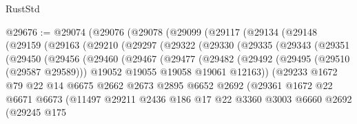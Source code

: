\begin{lexlean}{RustStd}
\begin{coremodule}
@29676 := @29074
    (@29076
      (@29078
        (@29099
          (@29117
            (@29134
              (@29148
                (@29159
                  (@29163
                    (@29210
                      (@29297
                        (@29322
                          (@29330
                            (@29335
                              (@29343
                                (@29351
                                  (@29450
                                    (@29456
                                      (@29460
                                        (@29467
                                          (@29477
                                            (@29482
                                              (@29492
                                                (@29495 (@29510 (@29587 @29589)))
                                                @19052
                                                @19055
                                                @19058
                                                @19061
                                                @12163))
                                            (@29233
                                              @1672
                                              @79
                                              @22
                                              @14
                                              @6675
                                              @2662
                                              @2673
                                              @2895
                                              @6652
                                              @2692
                                              (@29361
                                                @1672
                                                @22
                                                @6671
                                                @6673
                                                (@11497
                                                  @29211
                                                  @2436
                                                  @186
                                                  @17
                                                  @22
                                                  @3360
                                                  @3003
                                                  @6660
                                                  @2692
                                                  (@29245
                                                    @175

\end{coremodule}
\end{lexlean}
